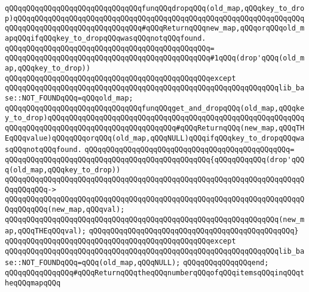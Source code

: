 \verb|qQQqqQQqqQQqqQQqqQQqqQQqqQQqqQQqfunqQQqdropqQQq(old_map,qQQqkey_to_drop)qQQqqQQqqQQqqQQqqQQqqQQqqQQqqQQqqQQqqQQqqQQqqQQqqQQqqQQqqQQqqQQqqQQqqQQqqQQqqQQqqQQqqQQqqQQqqQQqqQQq#qQQqReturnqQQqnew_map,qQQqorqQQqold_mapqQQqifqQQqkey_to_dropqQQqwasqQQqnotqQQqfound.|\newline
\verb|qQQqqQQqqQQqqQQqqQQqqQQqqQQqqQQqqQQqqQQqqQQqqQQq=|\newline
\verb|qQQqqQQqqQQqqQQqqQQqqQQqqQQqqQQqqQQqqQQqqQQqqQQq#1qQQq(drop'qQQq(old_map,qQQqkey_to_drop))|\newline
\verb|qQQqqQQqqQQqqQQqqQQqqQQqqQQqqQQqqQQqqQQqqQQqqQQqexcept|\newline
\verb|qQQqqQQqqQQqqQQqqQQqqQQqqQQqqQQqqQQqqQQqqQQqqQQqqQQqqQQqqQQqqQQqlib_base::NOT_FOUNDqQQq=qQQqold_map;|\newline
\newline
\verb|qQQqqQQqqQQqqQQqqQQqqQQqqQQqqQQqfunqQQqget_and_dropqQQq(old_map,qQQqkey_to_drop)qQQqqQQqqQQqqQQqqQQqqQQqqQQqqQQqqQQqqQQqqQQqqQQqqQQqqQQqqQQqqQQqqQQqqQQqqQQqqQQqqQQqqQQqqQQqqQQqqQQq#qQQqReturnqQQq(new_map,qQQqTHEqQQqvalue)qQQqqQQqorqQQq(old_map,qQQqNULL)qQQqifqQQqkey_to_dropqQQqwasqQQqnotqQQqfound.|\newline
\verb|qQQqqQQqqQQqqQQqqQQqqQQqqQQqqQQqqQQqqQQqqQQqqQQq=|\newline
\verb|qQQqqQQqqQQqqQQqqQQqqQQqqQQqqQQqqQQqqQQqqQQqqQQq{qQQqqQQqqQQq(drop'qQQq(old_map,qQQqkey_to_drop))|\newline
\verb|qQQqqQQqqQQqqQQqqQQqqQQqqQQqqQQqqQQqqQQqqQQqqQQqqQQqqQQqqQQqqQQqqQQqqQQqqQQqqQQq->|\newline
\verb|qQQqqQQqqQQqqQQqqQQqqQQqqQQqqQQqqQQqqQQqqQQqqQQqqQQqqQQqqQQqqQQqqQQqqQQqqQQqqQQq(new_map,qQQqval);|\newline
\newline
\verb|qQQqqQQqqQQqqQQqqQQqqQQqqQQqqQQqqQQqqQQqqQQqqQQqqQQqqQQqqQQqqQQq(new_map,qQQqTHEqQQqval);|\newline
\verb|qQQqqQQqqQQqqQQqqQQqqQQqqQQqqQQqqQQqqQQqqQQqqQQq}|\newline
\verb|qQQqqQQqqQQqqQQqqQQqqQQqqQQqqQQqqQQqqQQqqQQqqQQqexcept|\newline
\verb|qQQqqQQqqQQqqQQqqQQqqQQqqQQqqQQqqQQqqQQqqQQqqQQqqQQqqQQqqQQqqQQqlib_base::NOT_FOUNDqQQq=qQQq(old_map,qQQqNULL);|\newline
\verb|qQQqqQQqqQQqqQQqend;|\newline
\newline
\verb|qQQqqQQqqQQqqQQq#qQQqReturnqQQqtheqQQqnumberqQQqofqQQqitemsqQQqinqQQqtheqQQqmapqQQq|\newline
